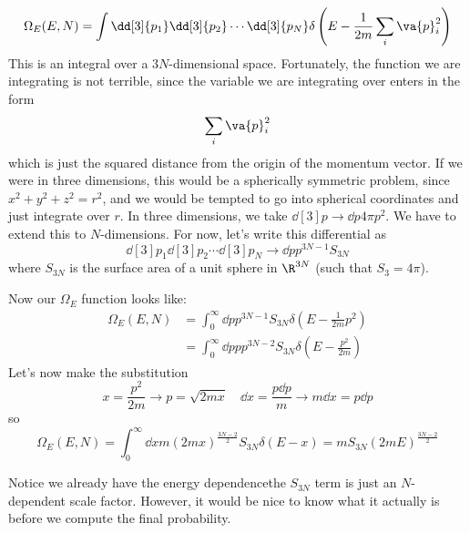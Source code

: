 \documentclass[a4paper,twoside,master.tex]{subfiles}
\begin{document}
\begin{equation}
    \Omega_E(E, N) = \int \dd[3]{p_1} \dd[3]{p_2} \cdots \dd[3]{p_N} \delta\left( E - \frac{1}{2m} \sum_i\va{ p}_i^2 \right)
\end{equation}
This is an integral over a $ 3N $-dimensional space. Fortunately, the function we are integrating is not terrible, since the variable we are integrating over enters in the form
\begin{equation}
    \sum_i\va{ p}_i^2
\end{equation}
which is just the squared distance from the origin of the momentum vector. If we were in three dimensions, this would be a spherically symmetric problem, since $ x^2 + y^2 + z^2 = r^2 $, and we would be tempted to go into spherical coordinates and just integrate over $ r $. In three dimensions, we take $ \dd[3]{p} \to \dd{p} 4 \pi p^2 $. We have to extend this to $ N $-dimensions. For now, let's write this differential as
\begin{equation}
    \dd[3]{p_1} \dd[3]{p_2} \cdots \dd[3]{p_N} \to \dd{p} p^{3N - 1} S_{3N}
\end{equation}
where $ S_{3N} $ is the surface area of a unit sphere in $ \R^{3N} $ (such that $ S_3 = 4 \pi $).

Now our $ \Omega_E $ function looks like:
\begin{align}
    \Omega_E(E, N) &= \int_{0}^{\infty} \dd{p} p^{3N-1} S_{3N} \delta(E - \frac{1}{2m} p^2) \\
    &= \int_0^{\infty} \dd{p} p p^{3N-2} S_{3N} \delta\left( E - \frac{p^2}{2m} \right)
\end{align}
Let's now make the substitution
\begin{equation}
    x = \frac{p^2}{2m} \to p = \sqrt{2mx} \quad \dd{x} = \frac{p \dd{p}}{m} \to m \dd{x} = p \dd{p}
\end{equation}
so
\begin{equation}
    \Omega_E(E,N) = \int_0^{\infty} \dd{x} m (2mx)^{\frac{3N-2}{2}} S_{3N} \delta(E-x) = m S_{3N}(2mE)^{\frac{3N-2}{2}}
\end{equation}

Notice we already have the energy dependence\textemdash the $ S_{3N} $ term is just an $ N $-dependent scale factor. However, it would be nice to know what it actually is before we compute the final probability.
\end{document}
